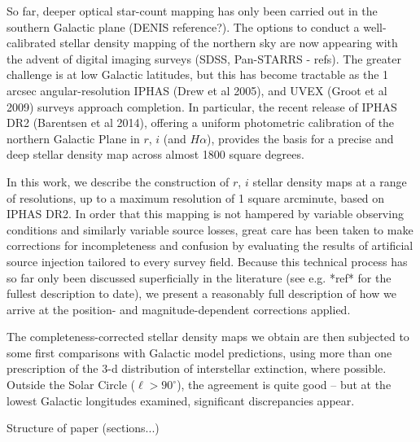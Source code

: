 \documentclass[a4paper,useAMS,usenatbib]{mn2e}
\begin{document}
So far, deeper optical star-count mapping has only been carried out in the 
southern Galactic plane (DENIS reference?).  The options to conduct a 
well-calibrated stellar density mapping of the northern sky are now 
appearing with the advent of digital imaging surveys (SDSS, Pan-STARRS - 
refs).  The greater challenge is at low Galactic latitudes, but this has become 
tractable as the 1 arcsec angular-resolution IPHAS (Drew et al 2005), and 
UVEX (Groot et al 2009) surveys approach completion.  In particular, the 
recent release of IPHAS DR2 (Barentsen et al 2014), offering a uniform 
photometric calibration of the northern Galactic Plane in $r$, $i$ (and 
$H\alpha$), provides the basis for a precise and deep stellar density map 
across almost 1800 square degrees.

In this work, we describe the construction of $r$, $i$ stellar density maps at
a range of resolutions, up to a maximum resolution of 1 square arcminute, 
based on IPHAS DR2.  In order that this mapping is not hampered by variable 
observing conditions and similarly variable source losses, great care has been 
taken to make corrections for incompleteness and confusion by evaluating the 
results of artificial source injection tailored to every survey field. Because 
this technical process has so far only been discussed superficially in the 
literature (see e.g. *ref* for the fullest description to date), we present a 
reasonably full description of how we arrive at the position- and 
magnitude-dependent corrections applied. 

The completeness-corrected stellar density maps we obtain are then subjected 
to some first comparisons with Galactic model predictions, using more than one 
prescription of the 3-d distribution of interstellar extinction, where possible.  
Outside the Solar Circle ($\ell > 90^{\circ}$), the agreement is quite good -- but 
at the lowest Galactic longitudes examined, significant discrepancies appear.

Structure of paper (sections...)
\end{document}
